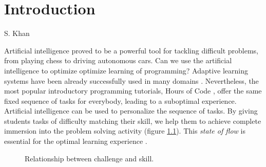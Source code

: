 \chapter{Introduction}
\label{chap:introduction}


{S. Khan}

Artificial intelligence proved to be a powerful tool for tackling difficult problems,
from playing chess to driving autonomous cars. %
Can we use the artificial intelligence to optimize optimize learning of programming?
Adaptive learning systems have been already successfully used in many domains
\cite{alg.evaluation-geography,
matmat.response-times, mathsgarden, sqltutor}.
Nevertheless, the most popular introductory programming tutorials,
Hours of Code \cite{hour-of-code},
offer the same fixed sequence of tasks for everybody,
leading to a suboptimal experience.
Artificial intelligence can be used to personalize the sequence of tasks.
By giving students tasks of difficulty matching their skill,
we help them to achieve complete immersion into the problem solving
activity (figure \ref{fig:flow}).
This \emph{state of flow} \cite{flow}
is essential for the optimal learning experience
\cite{adaptive-practice}.

\begin{figure}[htb]
  \centering
  \caption{Relationship between challenge and skill.}
  \label{fig:flow}
\end{figure}

